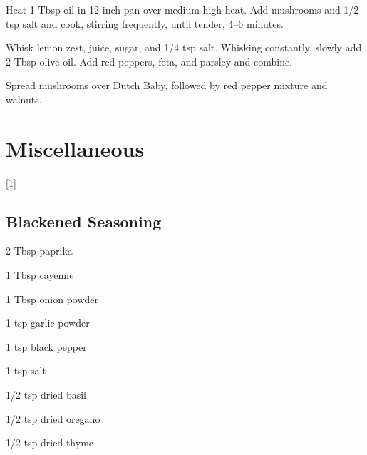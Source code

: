 \documentclass[oneside]{book}  %
\def\thisrecipe{}  %
\newcommand{\chapterrec}[1]{  %
  \newpage \def\thisrecipe{} \chapter{#1} \vspace{1.1em}
}
\newcommand{\chaptertoc}[1]{  %
  \chapterrec{#1} \vspace{-1.1em}  %
  \startcontents[chapters] \printcontents[chapters]{chapter_toc_}{1}[1]{}
}
\newcommand{\recipe}[1]{\section{#1}\def\thisrecipe{: #1}} %
\begin{document}
\begin{twocols}
  \begin{directions1col}
    \item Heat 1 Tbsp oil in 12-inch pan over medium-high heat. Add mushrooms
      and 1/2 tsp salt and cook, stirring frequently, until tender, 4--6
      minutes.
    \item Whisk lemon zest, juice, sugar, and 1/4 tsp salt. Whisking constantly,
      slowly add 2 Tbsp olive oil. Add red peppers, feta, and parsley and
      combine.
    \item Spread mushrooms over Dutch Baby, followed by red pepper mixture and
      walnuts.
  \end{directions1col}
\end{twocols}

\chaptertoc{Miscellaneous} \label{chap:miscellaneous}
\recipe{Blackened Seasoning} \label{recipe:blackened_seasoning} %

\begin{ingredients}
  \item[2 Tbsp] paprika
  \item[1 Tbsp] cayenne
  \item[1 Tbsp] onion powder
  \item[1 tsp] garlic powder
  \item[1 tsp] black pepper
  \item[1 tsp] salt
  \item[1/2 tsp] dried basil
  \item[1/2 tsp] dried oregano
  \item[1/2 tsp] dried thyme
\end{ingredients}
\end{document}
